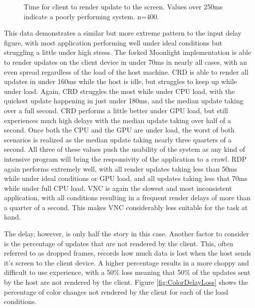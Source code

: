 \begin{figure}[h]
  \caption[Color Delay Data]{Time for client to render update to the screen. Values over 250ms indicate a poorly performing system. n=400.}
  \label{fig:ColorDelay}
\end{figure}

This data demonstrates a similar but more extreme pattern to the input delay figure, with most application performing well under ideal conditions but struggling a little under high stress.
The forked Moonlight implementation is able to render updates on the client device in under 70ms in nearly all cases, with an even spread regardless of the load of the host machine.
CRD is able to render all updates in under 160ms while the host is idle, but struggles to keep up while under load.
Again, CRD struggles the most while under CPU load, with the quickest update happening in just under 180ms, and the median update taking over a full second.
CRD performs a little better under GPU load, but still experiences much high delays with the median update taking over half of a second.
Once both the CPU and the GPU are under load, the worst of both scenarios is realized as the median update taking nearly three quarters of a second.
All three of these values push the usability of the system as any kind of intensive program will bring the responsivity of the application to a crawl.
RDP again performs extremely well, with all render updates taking less than 50ms while under ideal conditions or GPU load, and all updates taking less that 70ms while under full CPU load.
VNC is again the slowest and most inconsistent application, with all conditions resulting in a frequent render delays of more than a quarter of a second.
This makes VNC considerably less suitable for the task at hand.

The delay, however, is only half the story in this case.
Another factor to consider is the percentage of updates that are not rendered by the client.
This, often referred to as dropped frames, records how much data is lost when the host sends it's screen to the client device.
A higher percentage results in a more choppy and difficult to use experience, with a 50\% loss meaning that 50\% of the updates sent by the host are not rendered by the client.
Figure \ref{fig:ColorDelayLoss} shows the percentage of color changes not rendered by the client for each of the load conditions.

